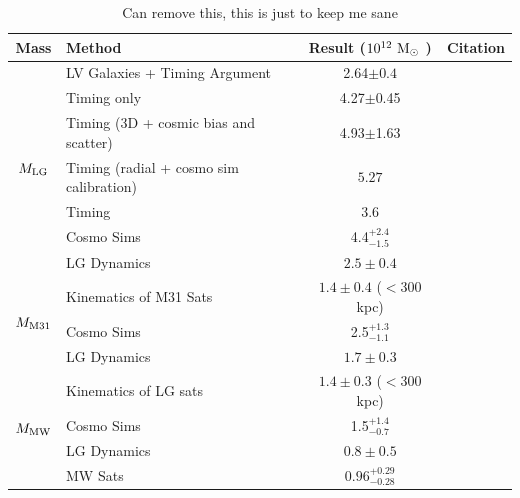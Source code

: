 \documentclass[twocolumn]{aastex631}
\newcommand{\mlg}{\ensuremath{M_{\rm LG}}}
\newcommand{\mmto}{\ensuremath{M_{\rm M31}}}
\newcommand{\mmw}{\ensuremath{M_{\rm MW}}}
\begin{document}
\begin{table}
  \centering
  \begin{tabular}{clc|c}
    \hline\hline
    Mass & Method & Result ($ 10^{12}~\mathrm{M}_\odot$ ) & Citation \\\hline
    \multirow{7}{*}{\mlg}  &{LV Galaxies + Timing Argument} & {2.64$\pm0.4$} & \cite{Penarrubia2016} \\
    &{Timing only} & {4.27$\pm$0.45} & \cite{vdm2012} \\
    &{Timing (3D + cosmic bias and scatter)} & {4.93$\pm$1.63} & \cite{vdm2012} \\
    &Timing (radial + cosmo sim calibration)  & $5.27$& \cite{LiWhite2008} \\
    &Timing & $3.6$ & \cite{Lynden-Bell:1981} \\
    & Cosmo Sims & 4.4$^{+2.4}_{-1.5}$ & \cite{Zhai2020}\\
    & LG Dynamics &$2.5\pm0.4$ & \cite{Diaz2014}\\
    \hline
    \multirow{3}{*}{\mmto}& Kinematics of M31 Sats & $1.4 \pm 0.4$ ($<$300 kpc) & \cite{Watkins2010}\\
    & Cosmo Sims & 2.5$^{+1.3}_{-1.1}$ & \cite{Zhai2020}\\
    & LG Dynamics &$1.7\pm0.3$ & \cite{Diaz2014}\\
    \hline
    \multirow{4}{*}{\mmw}&  Kinematics of LG sats & $1.4 \pm 0.3$ ($<$300 kpc) & \cite{Watkins2010}\\
    & Cosmo Sims & 1.5$^{+1.4}_{-0.7}$ & \cite{Zhai2020} \\
    & LG Dynamics &$0.8\pm0.5$ & \cite{Diaz2014}\\
    & MW Sats & $0.96^{+0.29}_{-0.28}$ & \cite{Patel2017}\\
  \hline\hline
  \end{tabular}
  \caption{\label{table:masses}Can remove this, this is just to keep me sane}
\end{table}


\end{document}
